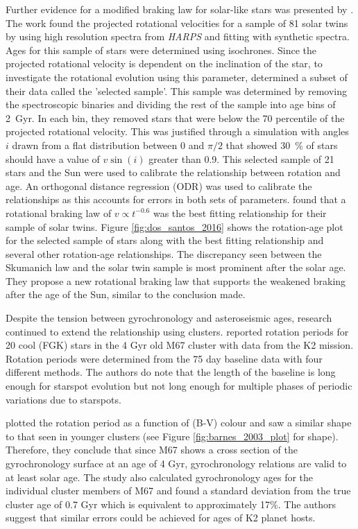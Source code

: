 Further evidence for a modified braking law for solar-like stars was presented by \citet{dos_Santos_etal_2016}. The work found the projected rotational velocities for a sample of 81 solar twins by using high resolution spectra from \textit{HARPS} and fitting with synthetic spectra. Ages for this sample of stars were determined using isochrones. Since the projected rotational velocity is dependent on the inclination of the star, to investigate the rotational evolution using this parameter, \citet{dos_Santos_etal_2016} determined a subset of their data called the 'selected sample'. This sample was determined by removing the spectroscopic binaries and dividing the rest of the sample into age bins of 2~Gyr. In each bin, they removed stars that were below the 70 percentile of the projected rotational velocity. This was justified through a simulation with angles $i$ drawn from a flat distribution between $0$ and $\pi/2$ that showed 30~\% of stars should have a value of $v\sin(i)$ greater than 0.9. This selected sample of 21 stars and the Sun were used to calibrate the relationship between rotation and age. An orthogonal distance regression (ODR) was used to calibrate the relationships as this accounts for errors in both sets of parameters. \citet{dos_Santos_etal_2016} found that a rotational braking law of $v \propto t^{-0.6}$ was the best fitting relationship for their sample of solar twins. Figure \ref{fig:dos_santos_2016} shows the rotation-age plot for the selected sample of stars along with the best fitting relationship and several other rotation-age relationships. The discrepancy seen between the Skumanich law and the solar twin sample is most prominent after the solar age. They propose a new rotational braking law that supports the weakened braking after the age of the Sun, similar to the conclusion \citet{van_Saders_etal_2016} made.

Despite the tension between gyrochronology and asteroseismic ages, research continued to extend the relationship using clusters. \citet{Barnes_etal_2016} reported rotation periods for 20 cool (FGK) stars in the 4 Gyr old M67 cluster with data from the K2 mission. Rotation periods were determined from the 75 day baseline data with four different methods. The authors do note that the length of the baseline is long enough for starspot evolution but not long enough for multiple phases of periodic variations due to starspots.

\citet{Barnes_etal_2016} plotted the rotation period as a function of (B-V) colour and saw a similar shape to that seen in younger clusters (see Figure \ref{fig:barnes_2003_plot} for shape). Therefore, they conclude that since M67 shows a cross section of the gyrochronology surface at an age of 4 Gyr, gyrochronology relations are valid to at least solar age. The study also calculated gyrochronology ages for the individual cluster members of M67 and found a standard deviation from the true cluster age of 0.7 Gyr which is equivalent to approximately 17\%. The authors suggest that similar errors could be achieved for ages of K2 planet hosts.

